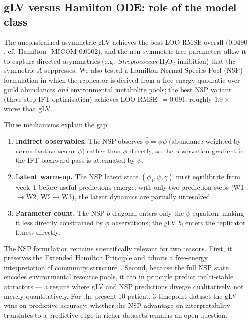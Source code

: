 \documentclass[11pt,a4paper]{article}
\begin{document}
\subsection{gLV versus Hamilton ODE: role of the model class}
\label{ssec:disc_glv_nsp}

The unconstrained asymmetric gLV achieves the best LOO-RMSE overall ($0.0490$, cf.\
Hamilton+MICOM $0.0502$), and the non-symmetric free parameters allow it to capture
directed asymmetries (e.g.\ \textit{Streptococcus} $\text{H}_2\text{O}_2$ inhibition)
that the symmetric $A$ suppresses.
We also tested a Hamilton Normal-Species-Pool (NSP) formulation in which the replicator
is derived from a free-energy quadratic over guild abundances \emph{and} environmental
metabolite pools; the best NSP variant (three-step IFT optimisation) achieves
LOO-RMSE~$=0.091$, roughly $1.9\times$ worse than gLV.

Three mechanisms explain the gap:
\begin{enumerate}[noitemsep]
  \item \textbf{Indirect observables.} The NSP observes $\bar\phi=\phi\psi$ (abundance
        weighted by normalisation scalar $\psi$) rather than $\phi$ directly, so
        the observation gradient in the IFT backward pass is attenuated by $\psi$.
  \item \textbf{Latent warm-up.} The NSP latent state $(\phi_0, \psi, \gamma)$ must
        equilibrate from week~1 before useful predictions emerge; with only two
        prediction steps (W1$\to$W2, W2$\to$W3), the latent dynamics are partially
        unresolved.
  \item \textbf{Parameter count.} The NSP $b$-diagonal enters only the $\psi$-equation,
        making it less directly constrained by $\phi$ observations; the gLV $b_i$
        enters the replicator fitness directly.
\end{enumerate}
The NSP formulation remains scientifically relevant for two reasons.
First, it preserves the Extended Hamilton Principle and admits a free-energy
interpretation of community structure~\citep{junker2021}.
Second, because the full NSP state encodes environmental resource pools,
it can in principle predict multi-stable attractors — a regime where gLV and NSP
predictions diverge qualitatively, not merely quantitatively.
For the present 10-patient, 3-timepoint dataset the gLV wins on predictive accuracy;
whether the NSP advantage on interpretability translates to a predictive edge in
richer datasets remains an open question.
\end{document}
